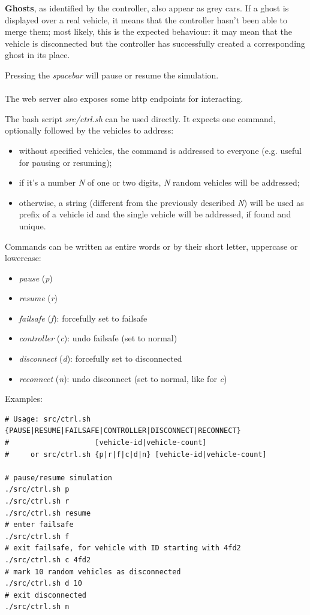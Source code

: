 \textbf{Ghosts}, as identified by the controller, also appear as grey cars. If a
ghost is displayed over a real vehicle, it means that the controller hasn't been
able to merge them; most likely, this is the expected behaviour: it may mean
that the vehicle is disconnected but the controller has successfully created a
corresponding ghost in its place.

Pressing the \textit{spacebar} will pause or resume the simulation.
\\
\\
The web server also exposes some http endpoints for interacting.

The bash script \textit{src/ctrl.sh} can be used directly. It expects one
command, optionally followed by the vehicles to address:
\begin{itemize}
  \item without specified vehicles, the command is addressed to everyone (e.g.
useful for pausing or resuming);
  \item if it's a number \textit{N} of one or two digits, \textit{N} random
vehicles will be addressed;
  \item otherwise, a string (different from the previously described \textit{N})
  will be used as prefix of a vehicle id and the single vehicle will be
  addressed, if found and unique.
\end{itemize}

Commands can be written as entire words or by their short letter, uppercase or
lowercase:
\begin{itemize}
  \item \textit{pause} (\textit{p})
  \item \textit{resume} (\textit{r})
  \item \textit{failsafe} (\textit{f}): forcefully set to failsafe
  \item \textit{controller} (\textit{c}): undo failsafe (set to normal)
  \item \textit{disconnect} (\textit{d}): forcefully set to disconnected
  \item \textit{reconnect} (\textit{n}): undo disconnect (set to normal, like
  for \textit{c})
\end{itemize}

Examples:
\begin{verbatim}
# Usage: src/ctrl.sh {PAUSE|RESUME|FAILSAFE|CONTROLLER|DISCONNECT|RECONNECT}
#                    [vehicle-id|vehicle-count]
#     or src/ctrl.sh {p|r|f|c|d|n} [vehicle-id|vehicle-count]

# pause/resume simulation
./src/ctrl.sh p
./src/ctrl.sh r
./src/ctrl.sh resume
# enter failsafe
./src/ctrl.sh f
# exit failsafe, for vehicle with ID starting with 4fd2
./src/ctrl.sh c 4fd2
# mark 10 random vehicles as disconnected
./src/ctrl.sh d 10
# exit disconnected
./src/ctrl.sh n
\end{verbatim}

